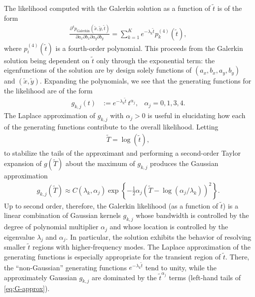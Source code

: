 The likelihood computed with the Galerkin solution as a
function of $\tilde{t}$ is of the form
\begin{align*}
  \frac{\partial^4 p_{\mbox{Galerkin}}(\tilde{x}, \tilde{y}, \tilde{t})}{\partial a_x
  \partial b_x \partial a_y \partial b_y} = \sum_{k=1}^{K} e^{-\lambda_k\tilde{t}} p_k^{(4)}(\tilde{t}),
\end{align*}
where $p_i^{(4)}(\tilde{t})$ is a fourth-order polynomial. This
proceeds from the Galerkin solution being dependent on $\tilde{t}$
only through the exponential term: the eigenfunctions of the solution
are by design solely functions of $(a_x, b_x, a_y, b_y)$ and
$(\tilde{x}, \tilde{y})$. Expanding the polynomials, we see that the
generating functions for the likelihood are of the form
\begin{align}
  g_{k,j}(t) &:= e^{-\lambda_k \tilde{t}}\, t^{\alpha_j}, & \alpha_j = 0, 1, 3, 4.
\end{align}
The Laplace approximation of $g_{k,j}$ with $\alpha_j > 0$ is useful
in elucidating how each of the generating functions contribute to the
overall likelihood. Letting
\begin{align}
  \tilde{T} = \log(\tilde{t}), 
\end{align}
to stabilize the tails of the approximant and performing a
second-order Taylor expansion of $g(\tilde{T})$ about the maximum
of $g_{k,j}$ produces the Gaussian approximation
\begin{align}
  g_{k,j}(\tilde{T}) \approx C(\lambda_k, \alpha_j) \exp\left\{ -\frac{1}{2}\alpha_j (\tilde{T} - \log(\alpha_j/\lambda_k))^2 \right\}. \label{eq:G-approx}
\end{align}
Up to second order, therefore, the Galerkin likelihood (as a function
of $\tilde{t}$) is a linear combination of Gaussian kernels $g_{k,j}$
whose bandwidth is controlled by the degree of polynomial multiplier
$\alpha_j$ and whose location is controlled by the eigenvalue
$\lambda_j$ and $\alpha_j$. In particular, the solution exhibits the
behavior of resolving smaller $\tilde{t}$ regions with
higher-frequency modes. The Laplace approximation of the generating
functions is especially appropriate for the transient region of
$\tilde{t}$. There, the ``non-Gaussian'' generating functions
$e^{-\lambda_k\tilde{t}}$ tend to unity, while the approximately
Gaussian $g_{k,j}$ are dominated by the $\tilde{t}^{\alpha_j}$ terms
(left-hand tails of \eqref{eq:G-approx}).


